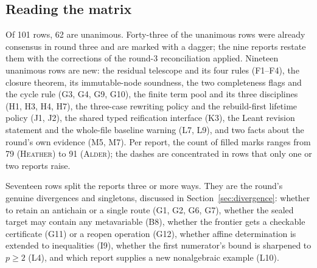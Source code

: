 \documentclass[11pt,a4paper]{article}
\newcommand{\Al}{\textsc{Alder}}
\newcommand{\He}{\textsc{Heather}}
\theoremstyle{definition}
\theoremstyle{plain}
\begin{document}
\subsection{Reading the matrix}
Of 101 rows, 62 are unanimous. Forty-three of the unanimous rows were already consensus in round three and are marked with a dagger; the nine reports restate them with the corrections of the round-3 reconciliation applied. Nineteen unanimous rows are new: the residual telescope and its four rules (F1--F4), the closure theorem, its immutable-node soundness, the two completeness flags and the cycle rule (G3, G4, G9, G10), the finite term pool and its three disciplines (H1, H3, H4, H7), the three-case rewriting policy and the rebuild-first lifetime policy (J1, J2), the shared typed reification interface (K3), the Leant revision statement and the whole-file baseline warning (L7, L9), and two facts about the round's own evidence (M5, M7). Per report, the count of filled marks ranges from 79 (\He) to 91 (\Al); the dashes are concentrated in rows that only one or two reports raise.

Seventeen rows split the reports three or more ways. They are the round's genuine divergences and singletons, discussed in Section~\ref{sec:divergence}: whether to retain an antichain or a single route (G1, G2, G6, G7), whether the sealed target may contain any metavariable (B8), whether the frontier gets a checkable certificate (G11) or a reopen operation (G12), whether affine determination is extended to inequalities (I9), whether the first numerator's bound is sharpened to $p\ge2$ (L4), and which report supplies a new nonalgebraic example (L10).
\end{document}
